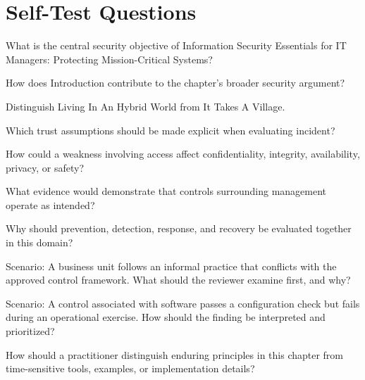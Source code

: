 \documentclass[11pt,letterpaper]{article}
\begin{document}
\section*{Self-Test Questions}
\begin{CornellRecallList}
\item What is the central security objective of Information Security Essentials for IT Managers: Protecting Mission-Critical Systems?
\item How does Introduction contribute to the chapter's broader security argument?
\item Distinguish Living In An Hybrid World from It Takes A Village.
\item Which trust assumptions should be made explicit when evaluating incident?
\item How could a weakness involving access affect confidentiality, integrity, availability, privacy, or safety?
\item What evidence would demonstrate that controls surrounding management operate as intended?
\item Why should prevention, detection, response, and recovery be evaluated together in this domain?
\item Scenario: A business unit follows an informal practice that conflicts with the approved control framework. What should the reviewer examine first, and why?
\item Scenario: A control associated with software passes a configuration check but fails during an operational exercise. How should the finding be interpreted and prioritized?
\item How should a practitioner distinguish enduring principles in this chapter from time-sensitive tools, examples, or implementation details?
\end{CornellRecallList}
\end{document}

